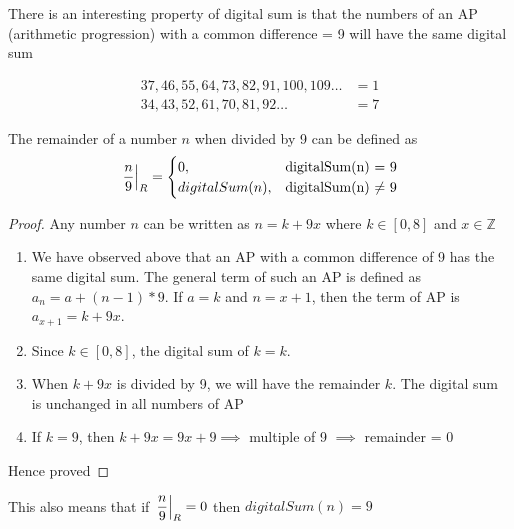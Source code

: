 There is an interesting property of digital sum is that the numbers of an AP (arithmetic progression) with a common difference = 9 will have the same digital sum

\begin{align*}
    37,46,55,64,73,82,91,100,109 \ldots &= 1 \\
    34,43,52,61,70,81,92 \ldots &= 7 
\end{align*}

\begin{theorem} \label{test}
    The remainder of a number $n$ when divided by 9 can be defined as
    \begin{equation*}
        \displaystyle{ \left. \frac{n}{9} \right |_{R} } = 
        \begin{cases}
            0, & \text{digitalSum(n) $=$ 9} \\
            digitalSum(n), & \text{digitalSum(n) $\neq$ 9} 
        \end{cases}
    \end{equation*}
\end{theorem}

\begin{proof}
    Any number $n$ can be written as $n = k + 9x$ where $k \in [0,8]$ and $x \in \mathbb{Z}$  \\
        \begin{enumerate}
            \item We have observed above that an AP with a common difference of 9 has the same digital sum. The general term of such an AP is defined as $a_n = a + (n-1)*9$. If $a = k$ and $n = x + 1$, then the term of AP is $a_{x+1} = k + 9x$. 
            \item Since $k \in [0,8]$, the digital sum of $k = k$. 
            \item When $k + 9x$ is divided by 9, we will have the remainder $k$. The digital sum is unchanged in all numbers of AP
            \item If $k=9$, then $k + 9x = 9x + 9 \implies$ multiple of 9 $\implies$ remainder = 0
        \end{enumerate}
    
    Hence proved
\end{proof}

\begin{NOTE}
    This also means that if $\displaystyle{ \left. \frac{n}{9} \right |_{R} } = 0$ then $digitalSum(n) = 9$
\end{NOTE}


